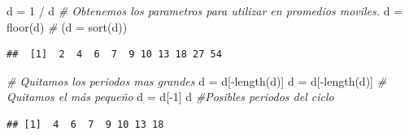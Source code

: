 \documentclass[
]{article}
\newenvironment{Shaded}{\begin{snugshade}}{\end{snugshade}}
\newcommand{\AttributeTok}[1]{\textcolor[rgb]{0.77,0.63,0.00}{#1}}
\newcommand{\CommentTok}[1]{\textcolor[rgb]{0.56,0.35,0.01}{\textit{#1}}}
\newcommand{\DecValTok}[1]{\textcolor[rgb]{0.00,0.00,0.81}{#1}}
\newcommand{\FunctionTok}[1]{\textcolor[rgb]{0.00,0.00,0.00}{#1}}
\newcommand{\NormalTok}[1]{#1}
\newcommand{\OtherTok}[1]{\textcolor[rgb]{0.56,0.35,0.01}{#1}}
\newcommand{\SpecialCharTok}[1]{\textcolor[rgb]{0.00,0.00,0.00}{#1}}
\begin{document}
\begin{Shaded}
\begin{Highlighting}[]
\NormalTok{d }\OtherTok{=} \DecValTok{1} \SpecialCharTok{/}\NormalTok{ d }\CommentTok{\# Obtenemos los parametros para utilizar en promedios moviles.}
\NormalTok{d }\OtherTok{=} \FunctionTok{floor}\NormalTok{(d) }\CommentTok{\#}
\NormalTok{(}\AttributeTok{d =} \FunctionTok{sort}\NormalTok{(d))}
\end{Highlighting}
\end{Shaded}

\begin{verbatim}
##  [1]  2  4  6  7  9 10 13 18 27 54
\end{verbatim}

\begin{Shaded}
\begin{Highlighting}[]
\CommentTok{\# Quitamos los periodos mas grandes}
\NormalTok{d }\OtherTok{=}\NormalTok{ d[}\SpecialCharTok{{-}}\FunctionTok{length}\NormalTok{(d)] }
\NormalTok{d }\OtherTok{=}\NormalTok{ d[}\SpecialCharTok{{-}}\FunctionTok{length}\NormalTok{(d)]}
\CommentTok{\# Quitamos el más pequeño}
\NormalTok{d }\OtherTok{=}\NormalTok{ d[}\SpecialCharTok{{-}}\DecValTok{1}\NormalTok{]}
\NormalTok{d }\CommentTok{\#Posibles periodos del ciclo }
\end{Highlighting}
\end{Shaded}

\begin{verbatim}
## [1]  4  6  7  9 10 13 18
\end{verbatim}
\end{document}
